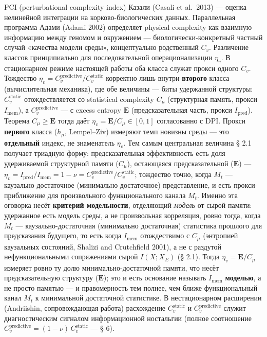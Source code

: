 \documentclass[pdflatex,sn-mathphys-ay]{sn-jnl}
\begin{document}
\begin{itemize}
  PCI (perturbational complexity index) Казали (Casali et al.~2013) --- оценка нелинейной интеграции на корково-биологических данных. Параллельная программа Адами (Adami 2002) определяет physical complexity как взаимную информацию между геномом и окружением --- биологически-конкретный частный случай «качества модели среды», концептуально родственный \(C_v\). Различение классов принципиально для последовательной операционализации \(\eta_v\). В стационарном режиме настоящей работы оба класса служат прокси одного \(C_v\). Тождество \(\eta_v = C_v^{\text{predictive}}/C_v^{\text{static}}\) корректно лишь внутри \textbf{второго} класса (вычислительная механика), где обе величины --- биты удержанной структуры: \(C_v^{\text{static}}\) отождествляется со statistical complexity \(C_\mu\) (структурная память, прокси \(I_{\text{mem}}\)), а \(C_v^{\text{predictive}}\) --- с excess entropy \(\mathbf{E}\) (предсказательная часть, прокси \(I_{\text{pred}}\)). Теорема \(C_\mu \ge \mathbf{E}\) тогда даёт \(\eta_v = \mathbf{E}/C_\mu \in [0, 1]\) согласованно с DPI. Прокси \textbf{первого} класса (\(h_\mu\), Lempel--Ziv) измеряют темп новизны среды --- это \textbf{отдельный} индекс, не знаменатель \(\eta_v\). Тем самым центральная величина § 2.1 получает триадную форму: предсказательная эффективность есть доля удерживаемой структурной памяти (\(C_\mu\)), остающаяся предсказательной (\(\mathbf{E}\)) --- \(\eta_v = I_{\text{pred}}/I_{\text{mem}} = 1 - \nu = C_v^{\text{predictive}}/C_v^{\text{static}}\); тождество точно, когда \(M_t\) --- каузально-достаточное (минимально достаточное) представление, и есть прокси-приближение для произвольного функционального канала \(M_t\). Именно эта оговорка несёт \textbf{критерий модельности}, отделяющий \emph{модель} от сырой памяти: удержанное есть модель среды, а не произвольная корреляция, ровно тогда, когда \(M_t\) --- каузально-достаточная (минимально достаточная) статистика прошлого для предсказания будущего, то есть когда \(I_{\text{mem}}\) отождествимо с \(C_\mu\) (энтропией каузальных состояний, Shalizi and Crutchfield 2001), а не с раздутой нефункциональными сопряжениями сырой \(I(X; X_E)\) (§ 2.1). Тогда \(\eta_v = \mathbf{E}/C_\mu\) измеряет ровно ту долю минимально-достаточной памяти, что несёт предсказательную структуру (\(\mathbf{E}\)); это и есть основание называть \(I_{\text{mem}}\) \textbf{моделью}, а не просто памятью --- и правомерность тем полнее, чем ближе функциональный канал \(M_t\) к минимальной достаточной статистике. В нестационарном расширении (Andriishin, сопровождающая работа) расхождение \(C_v^{\text{static}}\) и \(C_v^{\text{predictive}}\) служит диагностическим сигналом информационной ностальгии (полное соотношение \(C_v^{\text{predictive}} = (1-\nu)\,C_v^{\text{static}}\) --- § 6).
\end{itemize}
\end{document}
